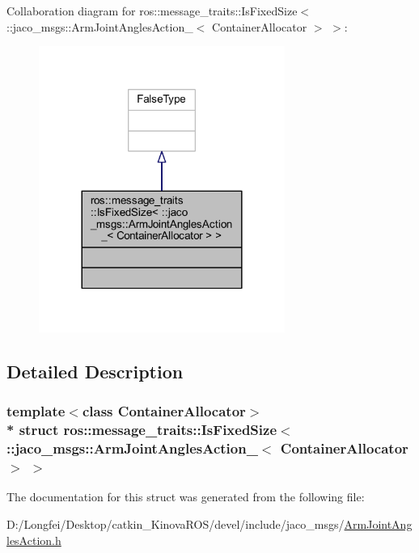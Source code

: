 Collaboration diagram for ros\+:\+:message\+\_\+traits\+:\+:Is\+Fixed\+Size$<$ \+:\+:jaco\+\_\+msgs\+:\+:Arm\+Joint\+Angles\+Action\+\_\+$<$ Container\+Allocator $>$ $>$\+:
\nopagebreak
\begin{figure}[H]
\begin{center}
\leavevmode
\includegraphics[width=228pt]{de/d10/structros_1_1message__traits_1_1IsFixedSize_3_01_1_1jaco__msgs_1_1ArmJointAnglesAction___3_01Con508adb05a4414bb68305d310336b0a8a}
\end{center}
\end{figure}


\subsection{Detailed Description}
\subsubsection*{template$<$class Container\+Allocator$>$\\*
struct ros\+::message\+\_\+traits\+::\+Is\+Fixed\+Size$<$ \+::jaco\+\_\+msgs\+::\+Arm\+Joint\+Angles\+Action\+\_\+$<$ Container\+Allocator $>$ $>$}



The documentation for this struct was generated from the following file\+:\begin{DoxyCompactItemize}
\item 
D\+:/\+Longfei/\+Desktop/catkin\+\_\+\+Kinova\+R\+O\+S/devel/include/jaco\+\_\+msgs/\hyperlink{ArmJointAnglesAction_8h}{Arm\+Joint\+Angles\+Action.\+h}\end{DoxyCompactItemize}
